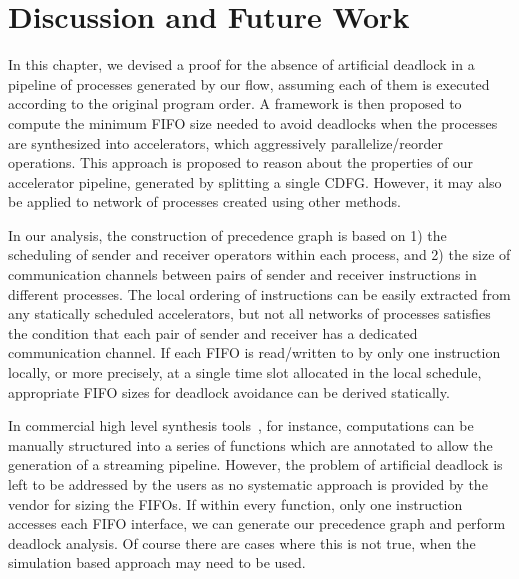 \section{Discussion and Future Work}
In this chapter, we devised a proof for the absence of artificial deadlock in a pipeline of processes
generated by our flow, assuming each of them is executed according to the original program order. A framework is then proposed to compute the minimum FIFO size needed to avoid deadlocks when the processes are synthesized into accelerators, which aggressively parallelize/reorder operations. This approach is proposed to reason about the properties of our accelerator pipeline, generated by
splitting a single CDFG. However, it may also be applied to network of processes
created using other methods.


In our analysis, the construction of precedence graph is based on 1) the scheduling of sender and receiver operators within each process, and 2) the size of communication channels between pairs of sender and receiver instructions in different processes.
The local ordering of instructions can be easily extracted from any statically scheduled accelerators, but not all networks of processes satisfies the condition that each pair of
sender and receiver has a dedicated communication channel. If each FIFO is read/written to by only one instruction locally, or more precisely, at a single time slot allocated in the local schedule,  
appropriate FIFO
sizes for deadlock avoidance can be derived statically.


In commercial high level synthesis tools~\cite{tools:vivadohls}, for instance, computations can be manually structured into a series of functions which are annotated to allow the generation of a streaming pipeline. However, the problem of artificial deadlock is left to be addressed by the users as no systematic approach is provided by the vendor for sizing the FIFOs. If within every function, only one instruction accesses each FIFO interface, we can generate our precedence graph and perform deadlock analysis. Of course there are cases where this is not true, when the simulation based approach may need to be used. 


